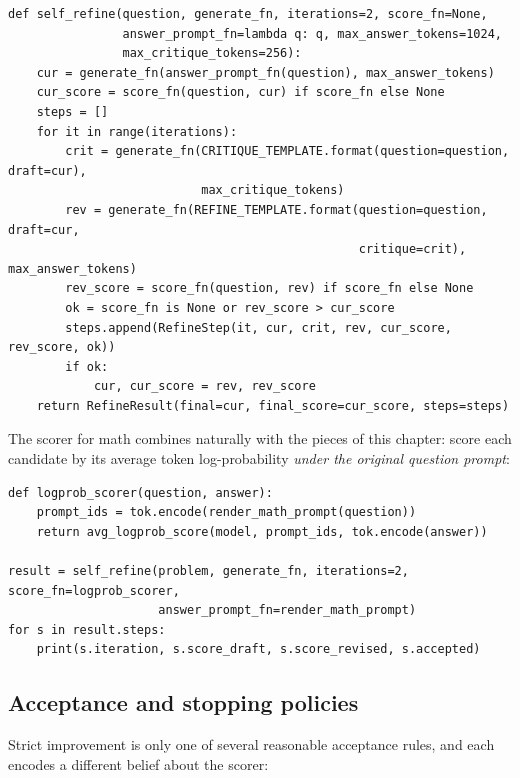 \begin{lstlisting}[caption={Score-gated self-refinement (condensed from \texttt{llmsys/tts.py}).},label={lst:refine:loop}]
def self_refine(question, generate_fn, iterations=2, score_fn=None,
                answer_prompt_fn=lambda q: q, max_answer_tokens=1024,
                max_critique_tokens=256):
    cur = generate_fn(answer_prompt_fn(question), max_answer_tokens)
    cur_score = score_fn(question, cur) if score_fn else None
    steps = []
    for it in range(iterations):
        crit = generate_fn(CRITIQUE_TEMPLATE.format(question=question, draft=cur),
                           max_critique_tokens)
        rev = generate_fn(REFINE_TEMPLATE.format(question=question, draft=cur,
                                                 critique=crit), max_answer_tokens)
        rev_score = score_fn(question, rev) if score_fn else None
        ok = score_fn is None or rev_score > cur_score
        steps.append(RefineStep(it, cur, crit, rev, cur_score, rev_score, ok))
        if ok:
            cur, cur_score = rev, rev_score
    return RefineResult(final=cur, final_score=cur_score, steps=steps)
\end{lstlisting}

The scorer for math combines naturally with the pieces of this chapter: score each candidate by its
average token log-probability \emph{under the original question prompt}:

\begin{lstlisting}[caption={Plugging the log-prob scorer into the loop.},label={lst:refine:plug}]
def logprob_scorer(question, answer):
    prompt_ids = tok.encode(render_math_prompt(question))
    return avg_logprob_score(model, prompt_ids, tok.encode(answer))

result = self_refine(problem, generate_fn, iterations=2, score_fn=logprob_scorer,
                     answer_prompt_fn=render_math_prompt)
for s in result.steps:
    print(s.iteration, s.score_draft, s.score_revised, s.accepted)
\end{lstlisting}


\subsection{Acceptance and stopping policies}
Strict improvement is only one of several reasonable acceptance rules, and each encodes a different
belief about the scorer:

